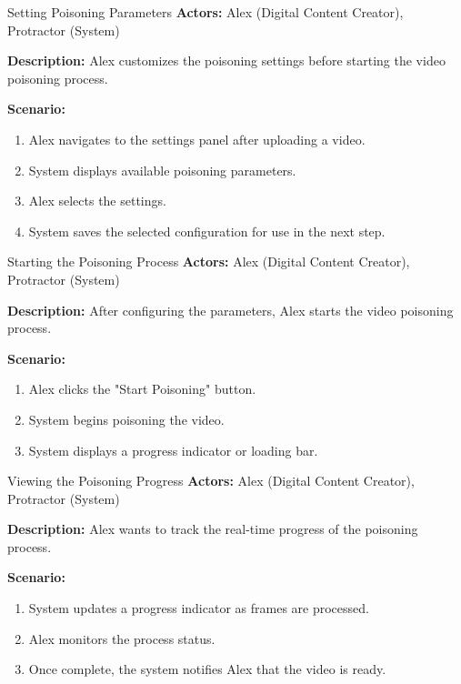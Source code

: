 \begin{usecase}{Setting Poisoning Parameters}
    \textbf{Actors:} Alex (Digital Content Creator), Protractor (System)

    \textbf{Description:} Alex customizes the poisoning settings before starting the video poisoning process.

    \textbf{Scenario:}
    \begin{enumerate}[leftmargin=80pt]
        \item Alex navigates to the settings panel after uploading a video.
        \item System displays available poisoning parameters.
        \item Alex selects the settings.
        \item System saves the selected configuration for use in the next step.
    \end{enumerate}
\end{usecase}

\begin{usecase}{Starting the Poisoning Process}
    \textbf{Actors:} Alex (Digital Content Creator), Protractor (System)

    \textbf{Description:} After configuring the parameters, Alex starts the video poisoning process.

    \textbf{Scenario:}
    \begin{enumerate}[leftmargin=80pt]
        \item Alex clicks the "Start Poisoning" button.
        \item System begins poisoning the video.
        \item System displays a progress indicator or loading bar.
    \end{enumerate}
\end{usecase}

\begin{usecase}{Viewing the Poisoning Progress}
    \textbf{Actors:} Alex (Digital Content Creator), Protractor (System)

    \textbf{Description:} Alex wants to track the real-time progress of the poisoning process.

    \textbf{Scenario:}
    \begin{enumerate}[leftmargin=80pt]
        \item System updates a progress indicator as frames are processed.
        \item Alex monitors the process status.
        \item Once complete, the system notifies Alex that the video is ready.
    \end{enumerate}
\end{usecase}

